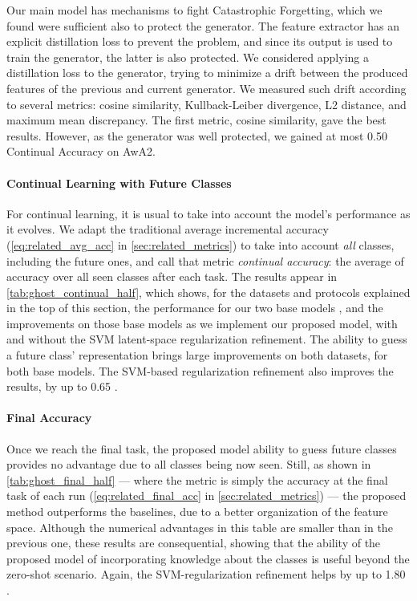Our main model has mechanisms to fight Catastrophic Forgetting, which we found were sufficient also
to protect the generator. The feature extractor has an explicit distillation loss to prevent the
problem, and since its output is used to train the generator, the latter is also protected. We
considered applying a distillation loss to the generator, trying to minimize a drift between the
produced features of the previous and current generator. We measured such drift according to several
metrics: cosine similarity, Kullback-Leiber divergence, L2 distance, and maximum mean discrepancy.
The first metric, cosine similarity, gave the best results. However, as the generator was well
protected, we gained at most 0.50 Continual Accuracy \pp on AwA2.





\paragraph{Continual Learning with Future Classes}
For continual learning, it is usual to take into account the model's performance as it evolves. We
adapt the traditional average incremental accuracy \citep{rebuffi2017icarl}
(\autoref{eq:related_avg_acc} in \autoref{sec:related_metrics}) to take into account \textit{all}
classes, including the future ones, and call that metric \textit{continual accuracy}: the average of
accuracy over all seen classes after each task. The results appear in
\autoref{tab:ghost_continual_half}, which shows, for the datasets and protocols explained in the top
of this section, the performance for our two base models \citep{hou2019ucir},
and the improvements on those base models as we implement our proposed model, with and without the
SVM latent-space regularization refinement. The ability to guess a future class' representation
brings large improvements on both datasets, for both base models. The SVM-based regularization
refinement also improves the results, by up to 0.65 \pp.



\paragraph{Final Accuracy} Once we reach the final task, the proposed model ability to guess future
classes provides no advantage due to all classes being now seen. Still, as shown in
\autoref{tab:ghost_final_half} — where the metric is simply the accuracy at the final task of each
run (\autoref{eq:related_final_acc} in \autoref{sec:related_metrics}) — the proposed method
outperforms the baselines, due to a better organization of the feature space. Although the numerical
advantages in this table are smaller than in the previous one, these results are consequential,
showing that the ability of the proposed model of incorporating knowledge about the classes is
useful beyond the zero-shot scenario. Again, the SVM-regularization refinement helps by up to 1.80
\pp.

